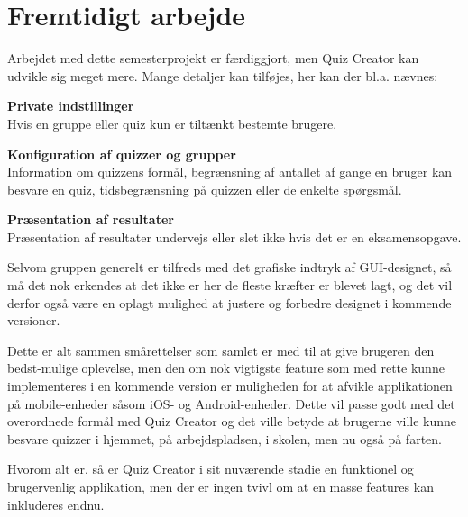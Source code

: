 \chapter{Fremtidigt arbejde}

Arbejdet med dette semesterprojekt er færdiggjort, men Quiz Creator kan udvikle sig meget mere. Mange detaljer kan tilføjes, her kan der bl.a. nævnes:

\textbf{Private indstillinger}\\
Hvis en gruppe eller quiz kun er tiltænkt bestemte brugere.

\textbf{Konfiguration af quizzer og grupper}\\
Information om quizzens formål, begrænsning af antallet af gange en bruger kan besvare en quiz, tidsbegrænsning på quizzen eller de enkelte spørgsmål.

\textbf{Præsentation af resultater}\\
Præsentation af resultater undervejs eller slet ikke hvis det er en eksamensopgave.

Selvom gruppen generelt er tilfreds med det grafiske indtryk af GUI-designet, så må det nok erkendes at det ikke er her de fleste kræfter er blevet lagt, og det vil derfor også være en oplagt mulighed at justere og forbedre designet i kommende versioner.

Dette er alt sammen smårettelser som samlet er med til at give brugeren den bedst-mulige oplevelse, men den om nok vigtigste feature som med rette kunne implementeres i en kommende version er muligheden for at afvikle applikationen på mobile-enheder såsom iOS- og Android-enheder. Dette vil passe godt med det overordnede formål med Quiz Creator og det ville betyde at brugerne ville kunne besvare quizzer i hjemmet, på arbejdspladsen, i skolen, men nu også på farten.

Hvorom alt er, så er Quiz Creator i sit nuværende stadie en funktionel og brugervenlig applikation, men der er ingen tvivl om at en masse features kan inkluderes endnu.